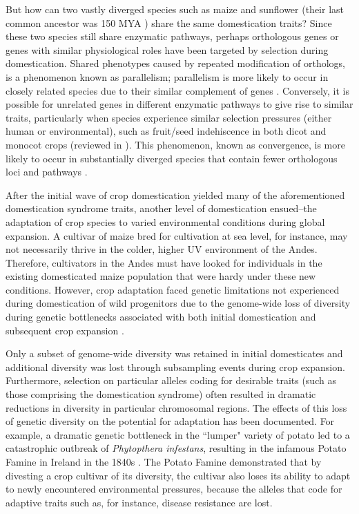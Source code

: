\documentclass[12pt]{article}
\begin{document}
But how can two vastly diverged species such as maize and sunflower  (their last common ancestor was 150 MYA \citep{Chang2004}) share the same domestication traits? 
Since these two species still share enzymatic pathways, perhaps orthologous genes or genes with similar physiological roles have been targeted by selection during domestication.
Shared phenotypes caused by repeated modification of orthologs, is a phenomenon known as parallelism; parallelism is more likely to occur in closely related species due to their similar complement of genes \citep{Pickersgill2018}.
Conversely, it is possible for unrelated genes in different enzymatic pathways to give rise to similar traits, particularly when species experience similar selection pressures (either human or environmental), such as fruit/seed indehiscence in both dicot and monocot crops (reviewed in \citep{Dong2015}).
This phenomenon, known as convergence, is more likely to occur in substantially diverged species that contain fewer orthologous loci and pathways \citep{Washburn2016, Pickersgill2018}.

After the initial wave of crop domestication yielded many of the aforementioned domestication syndrome traits, another level of domestication ensued--the adaptation of crop species to varied environmental conditions during global expansion.
A cultivar of maize bred for cultivation at sea level, for instance, may not necessarily thrive in the colder, higher UV environment of the Andes.
Therefore, cultivators in the Andes must have looked for individuals in the existing domesticated maize population that were hardy under these new conditions.
However, crop adaptation faced genetic limitations not experienced during domestication of wild progenitors due to the genome-wide loss of diversity during genetic bottlenecks associated with both initial domestication and subsequent crop expansion \cite{Wang2017}. 

Only a subset of genome-wide diversity was retained in initial domesticates and additional diversity was lost through subsampling events during crop expansion.
Furthermore, selection on particular alleles coding for desirable traits (such as those comprising the domestication syndrome) often resulted in dramatic reductions in diversity in particular chromosomal regions.
The effects of this loss of genetic diversity on the potential for adaptation has been documented.
For example, a dramatic genetic bottleneck in the ``lumper" variety of potato led to a catastrophic outbreak of \emph{Phytopthera infestans}, resulting in the infamous Potato Famine in Ireland in the 1840s \citep{Goodwin1994}.
The Potato Famine demonstrated that by divesting a crop cultivar of its diversity, the cultivar also loses its ability to adapt to newly encountered environmental pressures, because the alleles that code for adaptive traits such as, for instance, disease resistance are lost.
\end{document}
